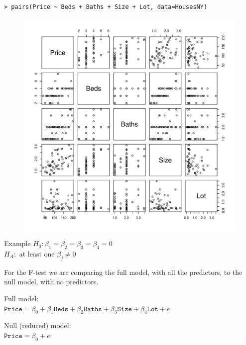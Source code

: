 \documentclass[10pt]{beamer}\usepackage[]{graphicx}\usepackage[]{color}
\begin{document}
\begin{frame}[fragile]
\small
\begin{verbatim}
> pairs(Price ~ Beds + Baths + Size + Lot, data=HousesNY)
\end{verbatim}
\vspace{-0.75cm}
\begin{figure}
\includegraphics[scale=0.45]{figure/ny_pairs.pdf}
\end{figure}
\end{frame}

\begin{frame}{Example}
$H_0: \beta_1 = \beta_2 = \beta_3 = \beta_4 = 0$\\
$H_A:$ at least one $\beta_j \neq 0$\\
\vspace{10pt}

For the F-test we are comparing the full model, with all the predictors, to the null model, with no predictors.\\
\vspace{10pt}

Full model:\\
$\texttt{Price} = \beta_0 + \beta_1 \texttt{Beds} + \beta_2 \texttt{Baths} + \beta_3 \texttt{Size} + \beta_4 \texttt{Lot} + e$\\
\vspace{10pt}

Null (reduced) model:\\
$\texttt{Price} = \beta_0 + e$\\
\end{frame}
\end{document}
